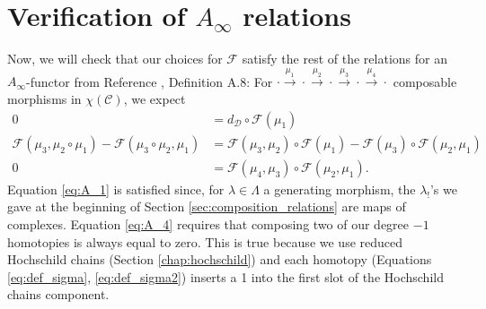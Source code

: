 
\section{Verification of $A_\infty$ relations} \label{sec:verify_A_relations}
Now, we will check that our choices 
for $\mathcal{F}$ satisfy the rest of the 
relations for an $A_\infty$-functor 
from Reference \cite{F}, Definition A.8:
For $\cdot 
\xrightarrow{\mu_1} \cdot 
\xrightarrow{\mu_2} \cdot
\xrightarrow{\mu_3} \cdot 
\xrightarrow{\mu_4} \cdot $ 
composable morphisms in $\chi(\mathcal{C})$, 
we expect
\begin{align} 
0
&= 
d_{\mathcal{D}} \circ \mathcal{F}(\mu_1)
\label{eq:A_1}\\
\mathcal{F}(\mu_3, \mu_2 \circ \mu_1) - 
  \mathcal{F}(\mu_3 \circ \mu_2, \mu_1)
&= 
\mathcal{F}(\mu_3, \mu_2) \circ \mathcal{F}(\mu_1) - 
  \mathcal{F}(\mu_3) \circ \mathcal{F}(\mu_2, \mu_1)
\label{eq:A_3}\\  
0
&= 
\mathcal{F}(\mu_4, \mu_3) \circ \mathcal{F}(\mu_2, \mu_1).  
\label{eq:A_4}
\end{align}
Equation \ref{eq:A_1} is satisfied 
since, for $\lambda \in \Lambda$ 
a generating morphism, the $\lambda_!$'s we 
gave at the beginning of Section 
\ref{sec:composition_relations} are maps 
of complexes. Equation \ref{eq:A_4} requires 
that composing two of our 
degree $-1$ homotopies is always equal to 
zero. This is true because we use 
reduced Hochschild chains (Section 
\ref{chap:hochschild}) and each homotopy 
(Equations \ref{eq:def_sigma}, \ref{eq:def_sigma2}) 
inserts a 1 into the first slot of the 
Hochschild chains component. 

